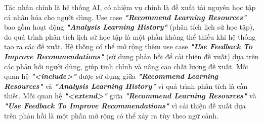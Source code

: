 \quad Tác nhân chính là hệ thống AI, có nhiệm vụ chính là đề xuất tài nguyên học tập cá nhân hóa cho người dùng. Use case \textbf{\textit{"Recommend Learning Resources"}} bao gồm hoạt động \textbf{\textit{"Analysis Learning History"}} (phân tích lịch sử học tập), do quá trình phân tích lịch sử học tập là một phần không thể thiếu khi hệ thống tạo ra các đề xuất. Hệ thống có thể mở rộng thêm use case \textbf{\textit{"Use Feedback To Improve Recommendations"}} (sử dụng phản hồi để cải thiện đề xuất) dựa trên các phản hồi người dùng, giúp tinh chỉnh và nâng cao chất lượng đề xuất. Mối quan hệ \textbf{\textit{"<include>"}} được sử dụng giữa \textbf{\textit{"Recommend Learning Resources"}} và \textbf{\textit{"Analysis Learning History"}} vì quá trình phân tích là cần thiết. Mối quan hệ \textbf{\textit{"<extend>"}} giữa \textbf{\textit{"Recommend Learning Resources"}} và \textbf{\textit{"Use Feedback To Improve Recommendations"}} vì cải thiện đề xuất dựa trên phản hồi là một phần mở rộng có thể xảy ra tùy theo ngữ cảnh.


